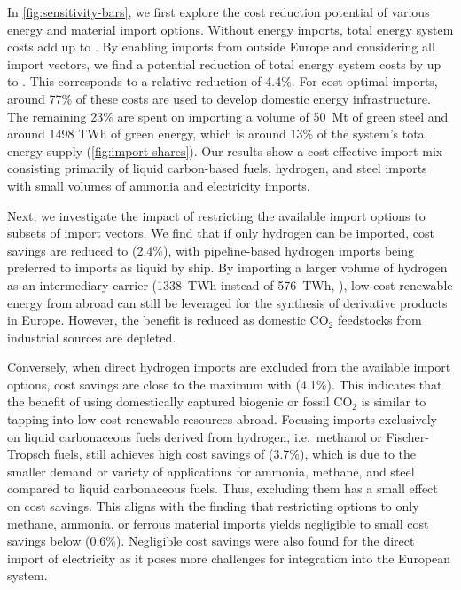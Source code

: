 In \cref{fig:sensitivity-bars}, we first explore the cost reduction potential of
various energy and material import options. Without energy imports, total energy
system costs add up to . By enabling imports from outside Europe and
considering all import vectors, we find a potential reduction of total energy
system costs by up to . This corresponds to a relative reduction of
4.4\%. For cost-optimal imports, around 77\% of these costs are used to develop
domestic energy infrastructure. The remaining 23\% are spent on importing a
volume of 50~Mt of green steel and around 1498 TWh of green energy, which is
around 13\% of the system's total energy supply (\cref{fig:import-shares}). Our
results show a cost-effective import mix consisting primarily of liquid
carbon-based fuels, hydrogen, and steel imports with small volumes of ammonia
and electricity imports.

Next, we investigate the impact of restricting the available import options to
subsets of import vectors. We find that if only hydrogen can be imported, cost
savings are reduced to  (2.4\%), with pipeline-based hydrogen imports
being preferred to imports as liquid by ship. By importing a larger volume of
hydrogen as an intermediary carrier (1338~TWh instead of 576~TWh,
), low-cost renewable energy from abroad can
still be leveraged for the synthesis of derivative products in Europe. However,
the benefit is reduced as domestic CO$_2$ feedstocks from industrial sources are
depleted.

Conversely, when direct hydrogen imports are excluded from the available import
options, cost savings are close to the maximum with  (4.1\%). This
indicates that the benefit of using domestically captured biogenic or fossil
CO$_2$ is similar to tapping into low-cost renewable resources abroad. Focusing
imports exclusively on liquid carbonaceous fuels derived from hydrogen,
i.e.~methanol or Fischer-Tropsch fuels, still achieves high cost savings of
 (3.7\%), which is due to the smaller demand or variety of
applications for ammonia, methane, and steel compared to liquid carbonaceous
fuels. Thus, excluding them has a small effect on cost savings. This aligns with
the finding that restricting options to only methane, ammonia, or ferrous
material imports yields negligible to small cost savings below 
(0.6\%). Negligible cost savings were also found for the direct import of
electricity as it poses more challenges for integration into the European
system.

